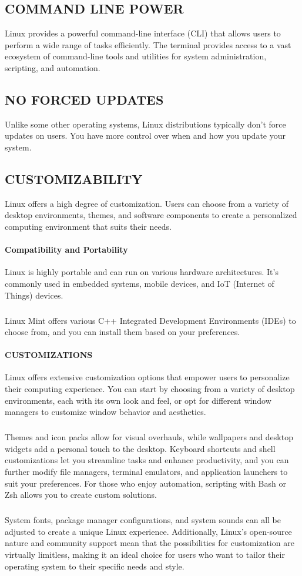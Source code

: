 \documentclass{article}
\begin{document}
\subsection{COMMAND LINE POWER}
 Linux provides a powerful command-line interface (CLI) that allows users to perform a wide range of tasks efficiently. The terminal provides access to a vast ecosystem of command-line tools and utilities for system administration, scripting, and automation.

\subsection{NO FORCED UPDATES}
Unlike some other operating systems, Linux distributions typically don't force updates on users. You have more control over when and how you update your system.

\subsection{CUSTOMIZABILITY}
Linux offers a high degree of customization. Users can choose from a variety of desktop environments, themes, and software components to create a personalized computing environment that suits their needs.
\newpage
{}
\paragraph{Compatibility and Portability}
Linux is highly portable and can run on various hardware architectures. It's commonly used in embedded systems, mobile devices, and IoT (Internet of Things) devices.

\subparagraph{}
Linux Mint offers various C++ Integrated Development Environments (IDEs) to choose from, and you can install them based on your preferences. 

\paragraph{CUSTOMIZATIONS}
Linux offers extensive customization options that empower users to personalize their computing experience. You can start by choosing from a variety of desktop environments, each with its own look and feel, or opt for different window managers to customize window behavior and aesthetics. 
\subparagraph{}
Themes and icon packs allow for visual overhauls, while wallpapers and desktop widgets add a personal touch to the desktop. Keyboard shortcuts and shell customizations let you streamline tasks and enhance productivity, and you can further modify file managers, terminal emulators, and application launchers to suit your preferences. For those who enjoy automation, scripting with Bash or Zsh allows you to create custom solutions. 
\subparagraph{}
System fonts, package manager configurations, and system sounds can all be adjusted to create a unique Linux experience. Additionally, Linux's open-source nature and community support mean that the possibilities for customization are virtually limitless, making it an ideal choice for users who want to tailor their operating system to their specific needs and style.
\end{document}
